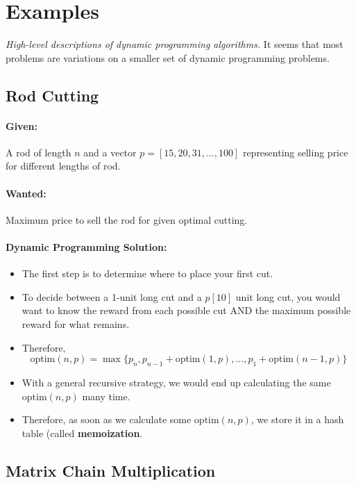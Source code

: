 \documentclass[a4paper,12pt]{report}
\begin{document}
\section{Examples}
\textit{High-level descriptions of dynamic programming algorithms.} It seems that most problems are variations on a smaller set of dynamic programming problems. 

\subsection{Rod Cutting}
\paragraph{Given: } A rod of length $n$ and a vector $p = [15, 20, 31, ..., 100]$ representing selling price for different lengths of rod. 

\paragraph{Wanted: } Maximum price to sell the rod for given optimal cutting.

\paragraph{Dynamic Programming Solution: } 
\begin{itemize}
\item The first step is to determine where to place your first cut. 
\item To decide between a 1-unit long cut and a $p[10]$ unit long cut, you would want to know the reward from each possible cut AND the maximum possible reward for what remains. 
\item Therefore, \begin{equation}
\text{optim}(n, p) = \max\{p_n, p_{n-1} + \text{optim}(1,p), ..., p_1+\text{optim}(n-1,p)\}
\end{equation}
\item With a general recursive strategy, we would end up calculating the same $\text{optim}(n,p)$ many time. 
\item Therefore, as soon as we calculate some $\text{optim}(n,p)$, we store it in a hash table (called \textbf{memoization}. 
\end{itemize}

\subsection{Matrix Chain Multiplication}
\end{document}
